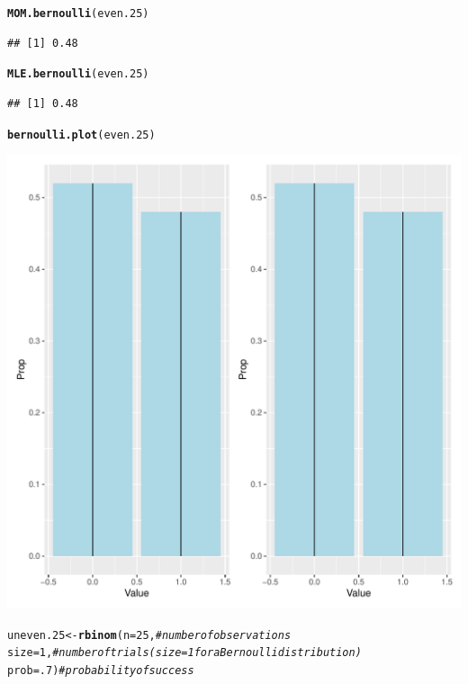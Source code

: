 \documentclass{article}\usepackage[]{graphicx}\usepackage[]{color}
\makeatletter
\def\maxwidth{ %
  \ifdim\Gin@nat@width>\linewidth
    \linewidth
  \else
    \Gin@nat@width
  \fi
}
\newcommand{\hlnum}[1]{\textcolor[rgb]{0.686,0.059,0.569}{#1}}%
\newcommand{\hlcom}[1]{\textcolor[rgb]{0.678,0.584,0.686}{\textit{#1}}}%
\newcommand{\hlstd}[1]{\textcolor[rgb]{0.345,0.345,0.345}{#1}}%
\newcommand{\hlkwb}[1]{\textcolor[rgb]{0.69,0.353,0.396}{#1}}%
\newcommand{\hlkwc}[1]{\textcolor[rgb]{0.333,0.667,0.333}{#1}}%
\newcommand{\hlkwd}[1]{\textcolor[rgb]{0.737,0.353,0.396}{\textbf{#1}}}%
\newenvironment{kframe}{%
 \def\at@end@of@kframe{}%
 \ifinner\ifhmode%
  \def\at@end@of@kframe{\end{minipage}}%
  \begin{minipage}{\columnwidth}%
 \fi\fi%
 \def\FrameCommand##1{\hskip\@totalleftmargin \hskip-\fboxsep
 \colorbox{shadecolor}{##1}\hskip-\fboxsep
     \hskip-\linewidth \hskip-\@totalleftmargin \hskip\columnwidth}%
 \MakeFramed {\advance\hsize-\width
   \@totalleftmargin\z@ \linewidth\hsize
   \@setminipage}}%
 {\par\unskip\endMakeFramed%
 \at@end@of@kframe}
\newenvironment{knitrout}{}{} %
\makeatother
\begin{document}
\begin{enumerate}
\begin{enumerate}
\begin{knitrout}
\begin{kframe}
\begin{alltt}
\hlkwd{MOM.bernoulli}\hlstd{(even.25)}
\end{alltt}
\begin{verbatim}
## [1] 0.48
\end{verbatim}
\begin{alltt}
\hlkwd{MLE.bernoulli}\hlstd{(even.25)}
\end{alltt}
\begin{verbatim}
## [1] 0.48
\end{verbatim}
\begin{alltt}
\hlkwd{bernoulli.plot}\hlstd{(even.25)}
\end{alltt}
\end{kframe}
\includegraphics[width=\maxwidth]{figure/unnamed-chunk-5-1} 
\begin{kframe}\begin{alltt}
\hlstd{uneven.25} \hlkwb{<-} \hlkwd{rbinom}\hlstd{(}\hlkwc{n}\hlstd{=}\hlnum{25}\hlstd{,}        \hlcom{#number of observations}
                    \hlkwc{size}\hlstd{=}\hlnum{1}\hlstd{,}        \hlcom{#number of trials (size=1 for a Bernoulli distribution)}
                    \hlkwc{prob}\hlstd{=}\hlnum{.7}\hlstd{)}       \hlcom{#probability of success}


\end{alltt}
\end{kframe}
\end{knitrout}
\end{enumerate}
\end{enumerate}
\end{document}

